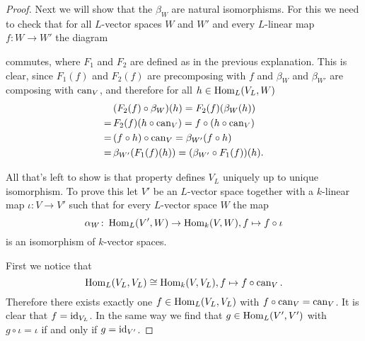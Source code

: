 \begin{proof}
  Next we will show that the $\beta_W$ are natural isomorphisms.
  For this we need to check that for all $L$-vector spaces $W$ and $W'$ and every $L$-linear map \mbox{$f \colon W \to W'$} the diagram
  \begin{center}
  \end{center}
  commutes, where $F_1$ and $F_2$ are defined as in the previous explanation.
  This is clear, since $F_1(f)$ and $F_2(f)$ are precomposing with $f$ and $\beta_W$ and $\beta_{W'}$ are composing with $\operatorname{can}_V$, and therefore for all $h \in \operatorname{Hom}_L(V_L, W)$
  \begin{align*}
     &\,  (F_2(f) \circ \beta_W)(h)
    =     F_2(f)(\beta_W(h)) \\
    =&\,  F_2(f)(h \circ \operatorname{can}_V)
    =     f \circ (h \circ \operatorname{can}_V) \\
    =&\,  (f \circ h) \circ \operatorname{can}_V
    =     \beta_{W'}(f \circ h) \\
    =&\,  \beta_{W'}(F_1(f)(h))
    =     (\beta_{W'} \circ F_1(f))(h).
  \end{align*}
  
  All that’s left to show is that property defines $V_L$ uniquely up to unique isomorphism.
  To prove this let $V'$ be an $L$-vector space together with a $k$-linear map $\iota \colon V \to V'$ such that for every $L$-vector space $W$ the map
  \[
            \alpha_W
    \colon  \operatorname{Hom}_L(V', W)
    \to     \operatorname{Hom}_k(V, W),
            f
    \mapsto f \circ \iota
  \]
  is an isomorphism of $k$-vector spaces.
  
  First we notice that
  \[
            \operatorname{Hom}_L(V_L, V_L)
    \cong   \operatorname{Hom}_k(V, V_L),
            f
    \mapsto f \circ \operatorname{can}_V.
  \]
  Therefore there exists exactly one $f \in \operatorname{Hom}_L(V_L, V_L)$ with $f \circ \operatorname{can}_V = \operatorname{can}_V$.
  It is clear that $f = \operatorname{id}_{V_L}$.
  In the same way we find that $g \in \operatorname{Hom}_L(V', V')$ with $g \circ \iota = \iota$ if and only if $g = \operatorname{id}_{V'}$.
  

\end{proof}
